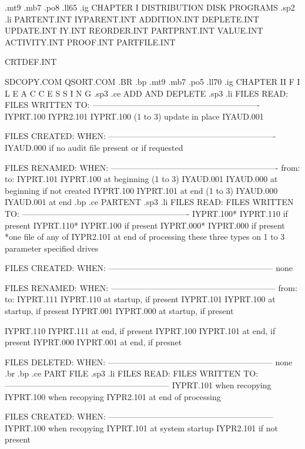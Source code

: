 .mt9
.mb7
.po8
.ll65
.ig
CHAPTER I
DISTRIBUTION DISK PROGRAMS
.sp2
.li
		  PARTENT.INT
		  IYPARENT.INT
		  ADDITION.INT
		  DEPLETE.INT
		  UPDATE.INT
		  IY.INT
		  REORDER.INT
		  PARTPRNT.INT
		  VALUE.INT
		  ACTIVITY.INT
		  PROOF.INT
		  PARTFILE.INT

		  CRTDEF.INT

		  SDCOPY.COM
		  QSORT.COM
.BR
.bp
.mt9
.mb7
.po5
.ll70
.ig
CHAPTER II
F I L E    A C C E S S I N G
.sp3
.ce
ADD AND DEPLETE
.sp3
.li
FILES READ:		   FILES WRITTEN TO:
-------------------------------------------------------------
IYPRT.100		   IYPR2.101
			   IYPRT.100 (1 to 3) update in place
			   IYAUD.001

FILES CREATED:		   WHEN:
-------------------------------------------------------------
IYAUD.000		   if no audit file present or
			   if requested

FILES RENAMED:		   WHEN:
-------------------------------------------------------------
from:	     to:
IYPRT.101    IYPRT.100	   at beginning (1 to 3)
IYAUD.001    IYAUD.000	   at beginning if not created
IYPRT.100    IYPRT.101	   at end (1 to 3)
IYAUD.000    IYAUD.001	   at end
.bp
.ce
PARTENT
.sp3
.li
FILES READ:		   FILES WRITTEN TO:
-------------------------------------------------------------
IYPRT.100*		   IYPRT.110 if present
IYPRT.110*		   IYPRT.100 if present
IYPRT.000*		   IYPRT.000 if present
*one file of any of	   IYPR2.101 at end of processing
these three types
on 1 to 3 parameter
specified drives

FILES CREATED:		   WHEN:
------------------------------------------------------------
none

FILES RENAMED:		   WHEN:
------------------------------------------------------------
from:	     to:
IYPRT.111    IYPRT.110	   at startup, if present
IYPRT.101    IYPRT.100	   at startup, if present
IYPRT.001    IYPRT.000	   at startup, if present

IYPRT.110    IYPRT.111	   at end, if present
IYPRT.100    IYPRT.101	   at end, if present
IYPRT.000    IYPRT.001	   at end, if presnet

FILES DELETED:		   WHEN:
------------------------------------------------------------
none
.br
.bp
.ce
PART FILE
.sp3
.li
FILES READ:		   FILES WRITTEN TO:
------------------------------------------------------------
IYPRT.101 when recopying   IYPRT.100  when recopying
			   IYPR2.101  at end of processing

FILES CREATED:		   WHEN:
------------------------------------------------------------
IYPRT.100		   when recopying
IYPRT.101		   at system startup
IYPR2.101		   if not present

